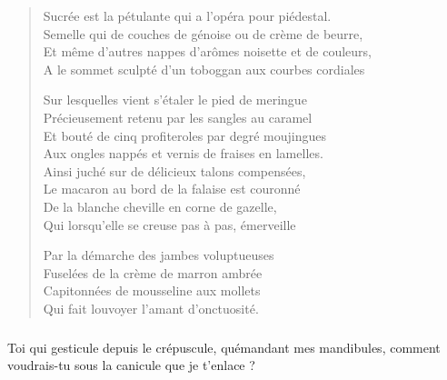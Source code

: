 \begin{verse}

Sucrée est la pétulante qui a l’opéra pour piédestal.\\
Semelle qui de couches de génoise ou de crème de beurre,\\
Et même d’autres nappes d’arômes noisette et de couleurs,\\
A le sommet sculpté d’un toboggan aux courbes cordiales

Sur lesquelles vient s’étaler le pied de meringue\\
Précieusement retenu par les sangles au caramel\\
Et bouté de cinq profiteroles par degré moujingues\\
Aux ongles nappés et vernis de fraises en lamelles.\\

Ainsi juché sur de délicieux talons compensées,\\
Le macaron au bord de la falaise est couronné\\
De la blanche cheville en corne de gazelle,\\
Qui lorsqu’elle se creuse pas à pas, émerveille

Par la démarche des jambes voluptueuses\\
Fuselées de la crème de marron ambrée\\
Capitonnées de mousseline aux mollets\\
Qui fait louvoyer l’amant d’onctuosité.
\end{verse}

\subparagraph{}
Toi qui gesticule depuis le crépuscule, quémandant mes mandibules, comment voudrais-tu sous la canicule que je t’enlace ?

